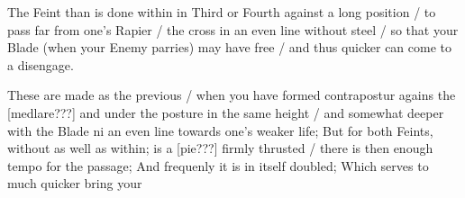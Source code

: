 The Feint than is done within in Third or Fourth against a long
position / to pass far from one's Rapier / the cross in an even line
without steel / so that your Blade (when your Enemy parries) may have
free / and thus quicker can come to a disengage.


These are made as the previous / when you have formed contrapostur
agains the [medlare???] and under the posture in the
same height / and somewhat deeper with the Blade ni an even line
towards one's weaker life; But for both Feints,
without as well as within; is a [pie???] firmly thrusted / there is
then enough tempo for the passage; And frequenly it is in itself
doubled; Which serves to much quicker bring your